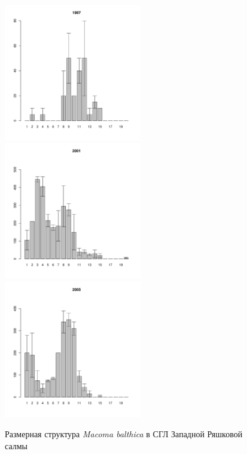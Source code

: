 \begin{figure}[ht]
\begin{multicols}{3}
\hfill
\includegraphics[width=60mm]{../White_Sea/Ryashkov_ZRS/zrs_1997_.pdf}
\hfill
\includegraphics[width=60mm]{../White_Sea/Ryashkov_ZRS/zrs_2001_.pdf}
\hfill
\includegraphics[width=60mm]{../White_Sea/Ryashkov_ZRS/zrs_2005_.pdf}
\end{multicols}


\caption{Размерная структура {\it Macoma balthica} в СГЛ Западной Ряшковой салмы}
\label{ris:size_str_ZRS}
\end{figure}



